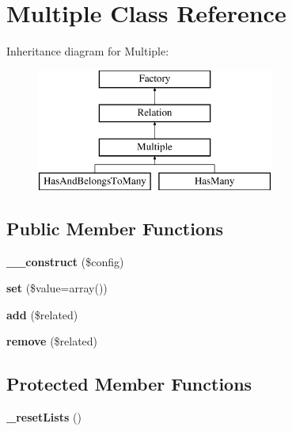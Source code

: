 \hypertarget{classMultiple}{
\section{Multiple Class Reference}
\label{classMultiple}
}
Inheritance diagram for Multiple:\begin{figure}[H]
\begin{center}
\leavevmode
\includegraphics[height=4.000000cm]{classMultiple}
\end{center}
\end{figure}
\subsection*{Public Member Functions}
\begin{DoxyCompactItemize}
\item 
\hypertarget{classMultiple_af84b36ff4e9d33e18f64ea23fd9e0027}{
{\bfseries \_\-\_\-construct} (\$config)}
\label{classMultiple_af84b36ff4e9d33e18f64ea23fd9e0027}

\item 
\hypertarget{classMultiple_a9bccf44832caa085b84824d92fa9b4a5}{
{\bfseries set} (\$value=array())}
\label{classMultiple_a9bccf44832caa085b84824d92fa9b4a5}

\item 
\hypertarget{classMultiple_af76c0bb93c51f7db76f655b75587cb89}{
{\bfseries add} (\$related)}
\label{classMultiple_af76c0bb93c51f7db76f655b75587cb89}

\item 
\hypertarget{classMultiple_a387456f14af859ef8bfb032a1a339a9f}{
{\bfseries remove} (\$related)}
\label{classMultiple_a387456f14af859ef8bfb032a1a339a9f}

\end{DoxyCompactItemize}
\subsection*{Protected Member Functions}
\begin{DoxyCompactItemize}
\item 
\hypertarget{classMultiple_acf12fc4233db925be6cd29ef99118dd5}{
{\bfseries \_\-resetLists} ()}
\label{classMultiple_acf12fc4233db925be6cd29ef99118dd5}

\end{DoxyCompactItemize}
